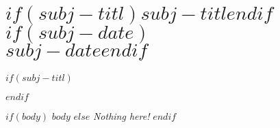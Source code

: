 \chapter*{$if(subj-titl)$\LARGE{$subj-titl$}$endif$ $if(subj-date)$\\ \normalfont\large{\textit{$subj-date$}}$endif$}

$if(subj-titl)$$endif$
\setcounter{section}{0}

$if(body)$
$body$
$else$
\textit{Nothing here!}
$endif$
